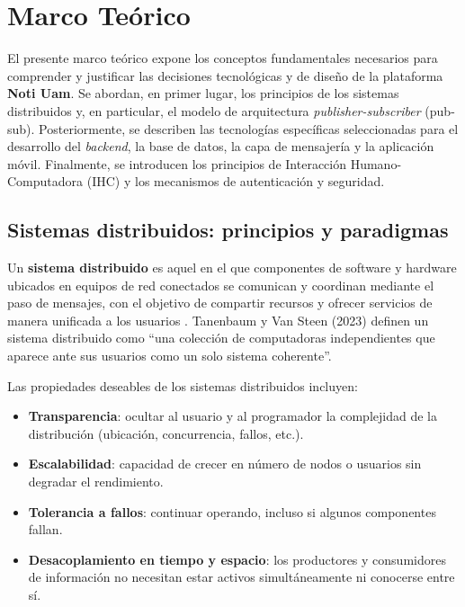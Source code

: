 \section{Marco Teórico}

El presente marco teórico expone los conceptos fundamentales necesarios para comprender y justificar las decisiones tecnológicas y de diseño de la plataforma \textbf{Noti Uam}. Se abordan, en primer lugar, los principios de los sistemas distribuidos y, en particular, el modelo de arquitectura \textit{publisher-subscriber} (pub-sub). Posteriormente, se describen las tecnologías específicas seleccionadas para el desarrollo del \textit{backend}, la base de datos, la capa de mensajería y la aplicación móvil. Finalmente, se introducen los principios de Interacción Humano-Computadora (IHC) y los mecanismos de autenticación y seguridad.

\subsection{Sistemas distribuidos: principios y paradigmas}

Un \textbf{sistema distribuido} es aquel en el que componentes de software y hardware ubicados en equipos de red conectados se comunican y coordinan mediante el paso de mensajes, con el objetivo de compartir recursos y ofrecer servicios de manera unificada a los usuarios \cite{coulouris2011distributed}. Tanenbaum y Van Steen (2023) definen un sistema distribuido como “una colección de computadoras independientes que aparece ante sus usuarios como un solo sistema coherente”.

Las propiedades deseables de los sistemas distribuidos incluyen:

\begin{itemize}[leftmargin=*]
    \item \textbf{Transparencia}: ocultar al usuario y al programador la complejidad de la distribución (ubicación, concurrencia, fallos, etc.).
    \item \textbf{Escalabilidad}: capacidad de crecer en número de nodos o usuarios sin degradar el rendimiento.
    \item \textbf{Tolerancia a fallos}: continuar operando, incluso si algunos componentes fallan.
    \item \textbf{Desacoplamiento en tiempo y espacio}: los productores y consumidores de información no necesitan estar activos simultáneamente ni conocerse entre sí.
\end{itemize}

